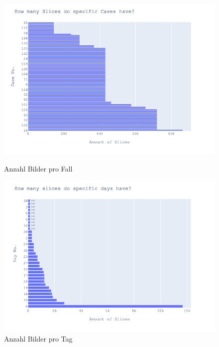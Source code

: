 \begin{figure}[!htb]
   \begin{minipage}{0.48\textwidth}
     \centering
     \includegraphics[width=1.2\linewidth]{bilder/slice_per_case}
     \caption{Anzahl Bilder pro Fall}\label{Fig:slice_per_case}
   \end{minipage}\hfill
   \begin{minipage}{0.48\textwidth}
     \centering
     \includegraphics[width=1.2\linewidth]{bilder/slices_per_day}
     \caption{Anzahl Bilder pro Tag}\label{Fig:slice_per_day}
   \end{minipage}
\end{figure}

